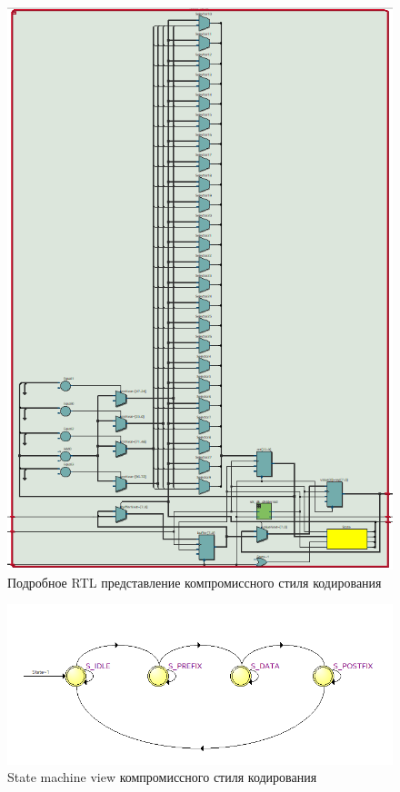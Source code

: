 \documentclass[a4paper,14pt]{article}
\begin{document}
	\begin{figure}[H]
		\centering
		\includegraphics[width=0.9\linewidth]{images/9_3_rtl2}
		\caption{Подробное RTL представление компромиссного стиля кодирования}
		\label{fig:9_3_rtl2}
	\end{figure}
	
	\begin{figure}[H]
		\centering
		\includegraphics[width=0.9\linewidth]{images/9_3_state}
		\caption{State machine view компромиссного стиля кодирования}
		\label{fig:9_3_state}
	\end{figure}
\end{document}
